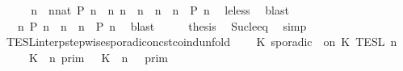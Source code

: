 \begin{isabellebody}
%
\isadelimproof
%
\endisadelimproof
%
\isatagproof
{}\isamarkupfalse%
\ {\isacharminus}\isanewline
\ \ \isamarkupfalse%
\ {\isacartoucheopen}{\isacharparenleft}{\isasymexists}n\ {\isasymge}\ {\isacharparenleft}nnat{\isacharparenright}{\isachardot}\ P\ n{\isacharparenright}\ {\isacharequal}\ {\isacharparenleft}{\isasymexists}n{\isachardot}\ {\isacharparenleft}n\ {\isacharequal}\ n\ {\isasymor}\ n\ {\isachargreater}\ n\ {\isasymand}\ P\ n{\isacharparenright}{\isacartoucheclose}\ \isamarkupfalse%
\ le{\isacharunderscore}less\ \isamarkupfalse%
\ blast\isanewline
\ \ \isamarkupfalse%
\ \isamarkupfalse%
\ {\isachardoublequoteopen}{\isachardot}{\isachardot}{\isachardot}\ {\isacharequal}\ {\isacharparenleft}{\isasymexists}n{\isachardot}\ {\isacharparenleft}P\ n\ {\isasymor}\ {\isacharparenleft}n\ {\isachargreater}\ n\ {\isasymand}\ P\ n{\isacharparenright}{\isacharparenright}{\isachardoublequoteclose}\ \isamarkupfalse%
\ blast\isanewline
\ \ \isamarkupfalse%
\ \isamarkupfalse%
\ {\isacharquery}thesis\ \isamarkupfalse%
\ Suc{\isacharunderscore}le{\isacharunderscore}eq\ \isamarkupfalse%
\ simp\isanewline
{}\isamarkupfalse%
%
\endisatagproof
{\isafoldproof}%
%
\isadelimproof
%
\endisadelimproof
%
\isadelimdocument
%
\endisadelimdocument
%
\isatagdocument
%
\isamarkuptrue%
%
\endisatagdocument
{\isafolddocument}%
%
\isadelimdocument
%
\endisadelimdocument
{}\isamarkupfalse%
\ TESL{\isacharunderscore}interp{\isacharunderscore}stepwise{\isacharunderscore}sporadicon{\isacharunderscore}cst{\isacharunderscore}coind{\isacharunderscore}unfold{\isacharcolon}\isanewline
\ \ \ {\isacartoucheopen}{\isasymlbrakk}\ K\ sporadic\ {\isasymtau}\ on\ K\ {\isasymrbrakk}\isactrlsub T\isactrlsub E\isactrlsub S\isactrlsub L\isactrlbsup {\isasymge}\ n\isactrlesup \ {\isacharequal}\isanewline
\ \ \ \ {\isasymlbrakk}\ K\ {\isasymUp}\ n\ {\isasymrbrakk}\isactrlsub p\isactrlsub r\isactrlsub i\isactrlsub m\ {\isasyminter}\ {\isasymlbrakk}\ K\ {\isasymDown}\ n\ {\isacharat}\ {\isasymtau}\ {\isasymrbrakk}\isactrlsub p\isactrlsub r\isactrlsub i\isactrlsub m\isanewline

\end{isabellebody}

